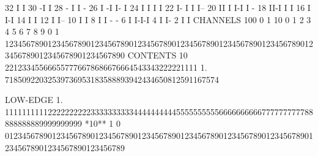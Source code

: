 \begin{Listing}
       32                                                              I                             I
       30                                                             -I                             I
       28                                                         -   I                              I  -
       26                                                         I  -I                              I- I
       24                                                         I  I                                I I
       22                                                         I- I                                I I--
       20                                                         II I                                I-I I -
       18                                                         II-I                                    I I
       16                                                         I                                       I-I
       14                                                         I                                         I
       12                                                         I                                         I--
       10                                                         I                                           I
        8                                                         I                                           I - -
        6                                                         I                                           I-I-I
        4                                                         I                                               I-
        2                                                         I                                                I
 CHANNELS 100   0                                                                                                  1   
           10   0        1         2         3         4         5         6         7         8         9         0   
            1   1234567890123456789012345678901234567890123456789012345678901234567890123456789012345678901234567890   
 CONTENTS  10                                                     221233455666557776678686676664543343222221111     
            1.                                                    71850922032539736953183588893942434650812591167574
 
 LOW-EDGE   1.            111111111122222222223333333333444444444455555555556666666666777777777788888888889999999999
 *10**  1   0   0123456789012345678901234567890123456789012345678901234567890123456789012345678901234567890123456789
 

\end{Listing}
